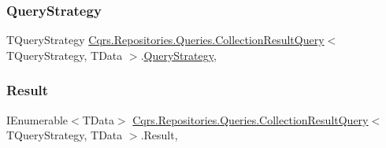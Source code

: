 \subsubsection{\texorpdfstring{Query\+Strategy}{QueryStrategy}}
{\footnotesize\ttfamily T\+Query\+Strategy \hyperlink{classCqrs_1_1Repositories_1_1Queries_1_1CollectionResultQuery}{Cqrs.\+Repositories.\+Queries.\+Collection\+Result\+Query}$<$ T\+Query\+Strategy, T\+Data $>$.\hyperlink{classCqrs_1_1Repositories_1_1Queries_1_1QueryStrategy}{Query\+Strategy}\hspace{0.3cm}{\ttfamily [get]}, {\ttfamily [set]}}

\mbox{\label{classCqrs_1_1Repositories_1_1Queries_1_1CollectionResultQuery_af2542c8b63668ddb39c2195c3280cd89_af2542c8b63668ddb39c2195c3280cd89}} 
\subsubsection{\texorpdfstring{Result}{Result}}
{\footnotesize\ttfamily I\+Enumerable$<$T\+Data$>$ \hyperlink{classCqrs_1_1Repositories_1_1Queries_1_1CollectionResultQuery}{Cqrs.\+Repositories.\+Queries.\+Collection\+Result\+Query}$<$ T\+Query\+Strategy, T\+Data $>$.Result\hspace{0.3cm}{\ttfamily [get]}, {\ttfamily [set]}}

